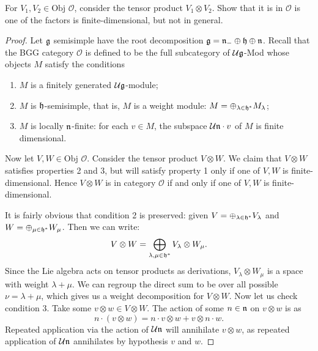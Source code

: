 \documentclass{../../mathnotes}
\begin{document}
\begin{prop}
    For $V_1,V_2\in\text{Obj }\mathcal{O}$, consider the tensor product $V_1\otimes V_2$.
    Show that it is in $\mathcal{O}$ is one of the factors is finite-dimensional, but
    not in general.
\end{prop}
\begin{proof}
    Let $\mathfrak g$ semisimple have the root decomposition $\mathfrak g=\mathfrak n_-\oplus\mathfrak h\oplus\mathfrak n$.
    Recall that the BGG category $\mathcal{O}$ is defined to be the full subcategory of
    $\mathcal{U}\mathfrak g$-Mod whose objects $M$ satisfy the conditions
    \begin{enumerate}
        \item $M$ is a finitely generated $\mathcal{U}\mathfrak g$-module;
        \item $M$ is $\mathfrak h$-semisimple, that is, $M$ is a weight module: $M=\oplus_{\lambda\in\mathfrak h^*}M_\lambda$;
        \item $M$ is locally $\mathfrak n$-finite: for each $v\in M$, the subspace $\mathcal{U}\mathfrak n\cdot v$ of $M$ is
            finite dimensional.
    \end{enumerate}
    Now let $V,W\in\text{Obj }\mathcal{O}$. Consider the tensor product $V\otimes W$. We
    claim that $V\otimes W$ satisfies properties 2 and 3, but will satisfy property 1 only
    if one of $V,W$ is finite-dimensional. Hence $V\otimes W$ is in category $\mathcal{O}$
    if and only if one of $V,W$ is finite-dimensional.

    It is fairly obvious that condition 2 is preserved: given $V=\oplus_{\lambda\in\mathfrak h^*}V_\lambda$
    and $W=\oplus_{\mu\in\mathfrak h^*}W_\mu$. Then we can write:
    \[ V\otimes W=\bigoplus_{\lambda,\mu\in\mathfrak h^*}V_\lambda\otimes W_\mu.  \]
    Since the Lie algebra acts on tensor products as derivations, $V_\lambda\otimes W_\mu$ is a
    space with weight $\lambda+\mu$. We can regroup the direct sum to be over all possible $\nu=\lambda+\mu$,
    which gives us a weight decomposition for $V\otimes W$.
    Now let us check condition 3. Take some $v\otimes w\in V\otimes W$. The action of some $n\in\mathfrak n$ on $v\otimes w$ is as
    \[n\cdot (v\otimes w)=n\cdot v\otimes w+v\otimes n\cdot w.\]
    Repeated application via the action of $\mathcal{U}\mathfrak n$ will annihilate $v\otimes w$, as
    repeated application of $\mathcal{U}\mathfrak n$ annihilates by hypothesis $v$ and $w$.


\end{proof}
\end{document}
